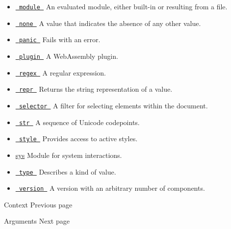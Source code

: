 \begin{itemize}
{  label for an element. }
\item
  \href{/docs/reference/foundations/module/}{\texttt{\ module\ }} { An
  evaluated module, either built-in or resulting from a file. }
\item
  \href{/docs/reference/foundations/none/}{\texttt{\ none\ }} { A value
  that indicates the absence of any other value. }
\item
  \href{/docs/reference/foundations/panic/}{\texttt{\ panic\ }} { Fails
  with an error. }
\item
  \href{/docs/reference/foundations/plugin/}{\texttt{\ plugin\ }} { A
  WebAssembly plugin. }
\item
  \href{/docs/reference/foundations/regex/}{\texttt{\ regex\ }} { A
  regular expression. }
\item
  \href{/docs/reference/foundations/repr/}{\texttt{\ repr\ }} { Returns
  the string representation of a value. }
\item
  \href{/docs/reference/foundations/selector/}{\texttt{\ selector\ }} {
  A filter for selecting elements within the document. }
\item
  \href{/docs/reference/foundations/str/}{\texttt{\ str\ }} { A sequence
  of Unicode codepoints. }
\item
  \href{/docs/reference/foundations/style/}{\texttt{\ style\ }} {
  Provides access to active styles. }
\item
  \href{/docs/reference/foundations/sys}{sys} { Module for system
  interactions. }
\item
  \href{/docs/reference/foundations/type/}{\texttt{\ type\ }} {
  Describes a kind of value. }
\item
  \href{/docs/reference/foundations/version/}{\texttt{\ version\ }} { A
  version with an arbitrary number of components. }
\end{itemize}

\href{/docs/reference/context/}{\pandocbounded{}}

{ Context } { Previous page }

\href{/docs/reference/foundations/arguments/}{\pandocbounded{}}

{ Arguments } { Next page }
